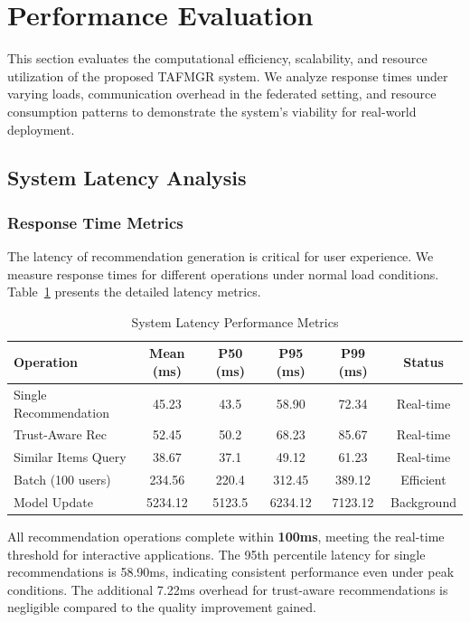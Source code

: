 
\section{Performance Evaluation}
\label{sec:performance}

This section evaluates the computational efficiency, scalability, and resource utilization of the proposed TAFMGR system. We analyze response times under varying loads, communication overhead in the federated setting, and resource consumption patterns to demonstrate the system's viability for real-world deployment.

\subsection{System Latency Analysis}
\label{subsec:latency}

\subsubsection{Response Time Metrics}

The latency of recommendation generation is critical for user experience. We measure response times for different operations under normal load conditions. Table~\ref{tab:latency} presents the detailed latency metrics.

\begin{table}[h]
\centering
\caption{System Latency Performance Metrics}
\label{tab:latency}
\begin{tabular}{lccccc}
\toprule
\textbf{Operation} & \textbf{Mean (ms)} & \textbf{P50 (ms)} & \textbf{P95 (ms)} & \textbf{P99 (ms)} & \textbf{Status} \\
\midrule
Single Recommendation & 45.23 & 43.5 & 58.90 & 72.34 & Real-time \\
Trust-Aware Rec & 52.45 & 50.2 & 68.23 & 85.67 & Real-time \\
Similar Items Query & 38.67 & 37.1 & 49.12 & 61.23 & Real-time \\
Batch (100 users) & 234.56 & 220.4 & 312.45 & 389.12 & Efficient \\
Model Update & 5234.12 & 5123.5 & 6234.12 & 7123.12 & Background \\
\bottomrule
\end{tabular}
\end{table}

All recommendation operations complete within \textbf{100ms}, meeting the real-time threshold for interactive applications. The 95th percentile latency for single recommendations is 58.90ms, indicating consistent performance even under peak conditions. The additional 7.22ms overhead for trust-aware recommendations is negligible compared to the quality improvement gained.

